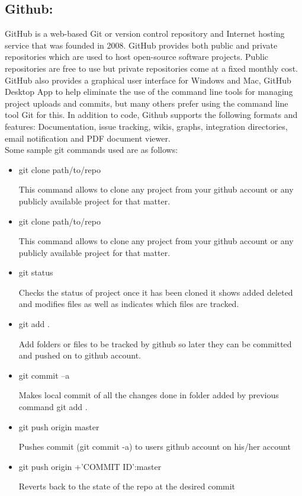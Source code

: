 \subsection{Github:}
GitHub is a web-based Git or version control repository and Internet hosting
service that was founded in 2008. GitHub provides both public and private repositories which are used to host open-source software projects. Public repositories are free to use but private repositories come at a fixed monthly cost. GitHub also provides a graphical user interface for
Windows and Mac, GitHub Desktop App to help eliminate the use of the command line tools for managing project uploads and commits, but many others prefer using the command line tool Git for this. In addition to code, Github supports the following formats and features: Documentation, issue tracking, wikis, graphs, integration directories, email notification and PDF document viewer\cite{WhatIsGi4}.
\\
Some sample git commands used are as follows:
\begin{itemize}
    \item git clone path/to/repo\par
    This command allows to clone any project from your github account
    or any publicly available project for that matter.

    \item git clone path/to/repo\par
    This command allows to clone any project from your github account
    or any publicly available project for that matter.
    
    \item git status\par
    Checks the status of project once it has been cloned it shows
    added deleted and modifies files as well as indicates which files
    are tracked.
    
    \item git add .\par
    Add folders or files to be tracked by github so later they can be
    committed and pushed on to github account.
    
    \item git commit –a\par
    Makes local commit of all the changes done in folder added by
    previous command git add .
    
    \item git push origin master\par
    Pushes commit (git commit -a) to users github account on his/her
    account
    
    \item git push origin +'COMMIT ID':master\par
    Reverts back to the state of the repo at the desired commit
\end{itemize}

